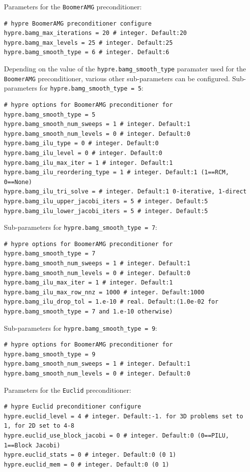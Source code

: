 \documentclass[11pt]{article}
\begin{document}
Parameters for the \verb|BoomerAMG| preconditioner:
\begin{lstlisting}[language=pkgconfig]
# hypre BoomerAMG preconditioner configure
hypre.bamg_max_iterations = 20 # integer. Default:20
hypre.bamg_max_levels = 25 # integer. Default:25
hypre.bamg_smooth_type = 6 # integer. Default:6
\end{lstlisting}

Depending on the value of the \verb|hypre.bamg_smooth_type| paramater used for the \verb|BoomerAMG| preconditioner, various other sub-parameters can be configured.
Sub-parameters for \verb|hypre.bamg_smooth_type = 5|:
\begin{lstlisting}[language=pkgconfig]
# hypre options for BoomerAMG preconditioner for hypre.bamg_smooth_type = 5
hypre.bamg_smooth_num_sweeps = 1 # integer. Default:1
hypre.bamg_smooth_num_levels = 0 # integer. Default:0
hypre.bamg_ilu_type = 0 # integer. Default:0
hypre.bamg_ilu_level = 0 # integer. Default:0
hypre.bamg_ilu_max_iter = 1 # integer. Default:1
hypre.bamg_ilu_reordering_type = 1 # integer. Default:1 (1==RCM, 0==None)
hypre.bamg_ilu_tri_solve = # integer. Default:1 0-iterative, 1-direct
hypre.bamg_ilu_upper_jacobi_iters = 5 # integer. Default:5
hypre.bamg_ilu_lower_jacobi_iters = 5 # integer. Default:5
\end{lstlisting}

Sub-parameters for \verb|hypre.bamg_smooth_type = 7|:
\begin{lstlisting}[language=pkgconfig]
# hypre options for BoomerAMG preconditioner for hypre.bamg_smooth_type = 7
hypre.bamg_smooth_num_sweeps = 1 # integer. Default:1
hypre.bamg_smooth_num_levels = 0 # integer. Default:0
hypre.bamg_ilu_max_iter = 1 # integer. Default:1
hypre.bamg_ilu_max_row_nnz = 1000 # integer. Default:1000
hypre.bamg_ilu_drop_tol = 1.e-10 # real. Default:(1.0e-02 for hypre.bamg_smooth_type = 7 and 1.e-10 otherwise)
\end{lstlisting}

Sub-parameters for \verb|hypre.bamg_smooth_type = 9|:
\begin{lstlisting}[language=pkgconfig]
# hypre options for BoomerAMG preconditioner for hypre.bamg_smooth_type = 9
hypre.bamg_smooth_num_sweeps = 1 # integer. Default:1
hypre.bamg_smooth_num_levels = 0 # integer. Default:0
\end{lstlisting}

Parameters for the \verb|Euclid| preconditioner:
\begin{lstlisting}[language=pkgconfig]
# hypre Euclid preconditioner configure
hypre.euclid_level = 4 # integer. Default:-1. for 3D problems set to 1, for 2D set to 4-8
hypre.euclid_use_block_jacobi = 0 # integer. Default:0 (0==PILU, 1==Block Jacobi)
hypre.euclid_stats = 0 # integer. Default:0 (0 1)
hypre.euclid_mem = 0 # integer. Default:0 (0 1)
\end{lstlisting}
\end{document}
